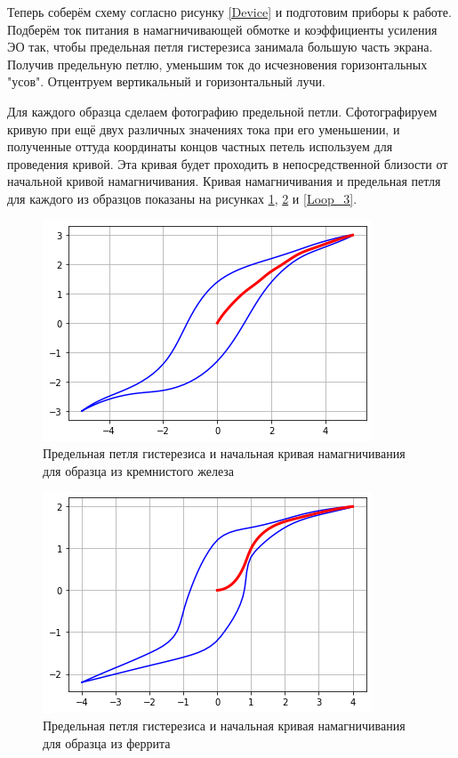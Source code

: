 \documentclass[a4paper,10pt]{article}
\begin{document}
Теперь соберём схему согласно рисунку \ref{Device} и подготовим приборы к работе. Подберём ток питания в намагничивающей обмотке и коэффициенты усиления ЭО так, чтобы предельная петля гистерезиса занимала большую часть экрана. Получив предельную петлю, уменьшим ток до исчезновения горизонтальных "усов". Отцентруем вертикальный и горизонтальный лучи.

Для каждого образца сделаем фотографию предельной петли. Сфотографируем кривую при ещё двух различных значениях тока при его уменьшении, и полученные оттуда координаты концов частных петель используем для проведения кривой. Эта кривая будет проходить в непосредственной близости от начальной кривой намагничивания. Кривая намагничивания и предельная петля для каждого из образцов показаны на рисунках \ref{Loop_1}, \ref{Loop_2} и \ref{Loop_3}. 

\begin{figure}[h!]
	\centering
	\includegraphics[scale=0.8]{lab345ris3.png}
	\caption{Предельная петля гистерезиса и начальная кривая намагничивания для образца из кремнистого железа} \label{Loop_1}
\end{figure}

\begin{figure}[h!]
	\centering
	\includegraphics[scale=0.8]{lab345ris4.png}
	\caption{Предельная петля гистерезиса и начальная кривая намагничивания для образца из феррита} \label{Loop_2}
\end{figure}
\end{document}

